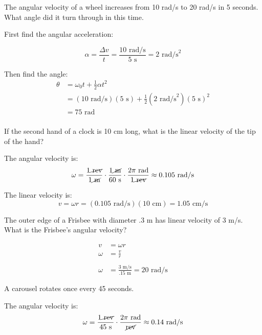 \documentclass{exam}
\begin{document}
\begin{questions}
\item The angular velocity of a wheel increases from 10 rad/s to 20 rad/s in 5 seconds.  What angle did it turn through in
  this time.

\begin{solution}
First find the angular acceleration:

\[
  \alpha = \frac{\Delta v}{t} = \frac{10 \text{ rad/s}}{5 \text{ s}} = 2 \text{ rad/s}^2
\]

Then find the angle:
\begin{align*}
  \theta &= \omega_0 t + \frac{1}{2} \alpha t^2 \\
    &= (10 \text{ rad/s})(5 \text{ s}) + \frac{1}{2} (2 \text{ rad/s}^2)(5 \text{ s})^2 \\
    &= 75 \text{ rad} \\
\end{align*}


\end{solution}

\item If the second hand of a clock is 10 cm long, what is the linear velocity of the tip of the hand?
\begin{solution}
The angular velocity is:
\[
  \omega = \frac{1 \cancel{\text{ rev}}}{1 \cancel{\text{ m}}} 
      \cdot \frac{1 \cancel{\text{ m}}}{60 \text{ s}} 
      \cdot \frac{2 \pi \text{ rad}}{1 \cancel{\text{ rev}}} 
      \approx 0.105 \text{ rad/s}
\]

The linear velocity is:
\[
  v = \omega r = (0.105 \text{ rad/s})(10 \text{ cm}) = 1.05 \text{ cm/s}
\]

\end{solution}

\item The outer edge of a Frisbee with diameter .3 m has linear velocity of 3 m/s.  What is the Frisbee's angular velocity?

\begin{solution}
\begin{align*}
  v &= \omega r \\
  \omega &= \frac{v}{r} \\
  \\
  \omega &= \frac{3 \text{ m/s}}{.15 \text{ m}} = 20 \text{ rad/s}
\end{align*}

\end{solution}

\item A carousel rotates once every 45 seconds.
\begin{solution}
The angular velocity is:
\[
  \omega = \frac{1 \cancel{\text{ rev}}}{45 \text{ s}} \cdot \frac{2 \pi \text{ rad}}{\cancel{\text{rev}}} 
      \approx 0.14 \text{ rad/s}
\]


\end{solution}
\end{questions}
\end{document}
